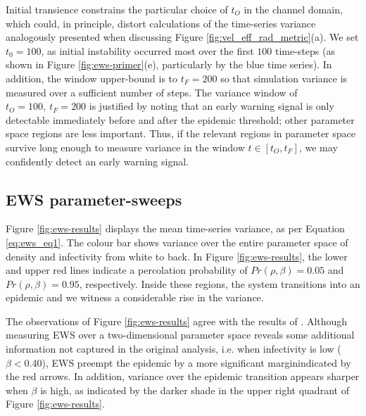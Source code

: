 Initial transience constrains the particular choice of $t_O$ in the channel domain, 
which could, in principle, distort calculations of the time-series variance\textemdash 
analogously presented when discussing Figure \ref{fig:vel_eff_rad_metric}(a). 
We set $t_0=100$, as initial instability occurred most over the first $100$ time-steps 
(as shown in Figure \ref{fig:ews-primer}(e), particularly by the blue time series). 
In addition, the window upper-bound is to $t_F = 200$ so that simulation variance is measured over a sufficient number of steps.
The variance window of $t_O=100,\ t_F=200$ is justified by noting that an early warning signal is only detectable immediately before 
and after the epidemic threshold; other parameter space regions are less important.
Thus, if the relevant regions in parameter space survive long enough to measure variance in the window $t \in [t_O, t_F]$, 
we may confidently detect an early warning signal.

\subsection{EWS parameter-sweeps}
\label{section:ews_slm}

Figure \ref{fig:ews-results} displays the mean time-series variance, as per Equation \ref{eq:ews_eq1}.
The colour bar shows variance over the entire parameter space of density and infectivity from white to back.
In Figure \ref{fig:ews-results}, the lower and upper red lines indicate a percolation probability of $Pr(\rho, \beta)=0.05$ and $Pr(\rho, \beta)=0.95$, respectively.
Inside these regions, the system transitions into an epidemic and we witness a considerable rise in the variance.

The observations of Figure \ref{fig:ews-results} agree with the results of \cite{OROZCOFUENTES201912}. 
Although measuring EWS over a two-dimensional parameter space reveals some additional information not captured in the original analysis, i.e. when infectivity is low ($\beta<0.40$), EWS preempt the epidemic by a more significant margin\textemdash indicated by the red arrows.
In addition, variance over the epidemic transition appears sharper when $\beta$ is high, as indicated by the darker shade in the upper right quadrant of Figure \ref{fig:ews-results}.

